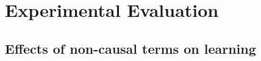 \documentclass[10pt]{article} %
\begin{document}


    


\section{Experimental Evaluation}\label{sec:experimental_evaluation}

    
    
    

    

    \subsection{Effects of non-causal terms on learning}\label{sec:effects_causality}
\end{document}
